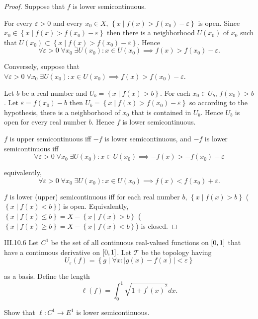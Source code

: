 \begin{proof}
    Suppose that \( f \) is lower semicontinuous.

    For every \( \varepsilon > 0 \) and every \( x_{0} \in X \), \( \left\{ x \mid f(x) > f(x_{0}) - \varepsilon \right\} \) is open. Since \( x_{0} \in \left\{ x \mid f(x) > f(x_{0}) - \varepsilon \right\} \) then there is a neighborhood \( U(x_{0}) \) of \( x_{0} \) such that \( U(x_{0}) \subset \left\{ x \mid f(x) > f(x_{0}) - \varepsilon \right\} \). Hence
    \[
        \forall \varepsilon > 0\; \forall x_{0}\; \exists U(x_{0}): x \in U(x_{0}) \implies f(x) > f(x_{0}) - \varepsilon.
    \]

    Conversely, suppose that \( \forall \varepsilon > 0\; \forall x_{0}\; \exists U(x_{0}): x \in U(x_{0}) \implies f(x) > f(x_{0}) - \varepsilon \).

    Let \( b \) be a real number and \( U_{b} = \left\{ x \mid f(x) > b \right\} \). For each \( x_{0} \in U_{b} \), \( f(x_{0}) > b \). Let \( \varepsilon = f(x_{0}) - b \) then \( U_{b} = \left\{ x \mid f(x) > f(x_{0}) - \varepsilon \right\} \) so according to the hypothesis, there is a neighborhood of \( x_{0} \) that is contained in \( U_{b} \). Hence \( U_{b} \) is open for every real number \(b\). Hence \( f \) is lower semicontinuous.

    \bigskip
    \(f\) is upper semicontinuous iff \( -f \) is lower semicontinuous, and \( -f \) is lower semicontinuous iff
    \[
        \forall \varepsilon > 0\; \forall x_{0}\; \exists U(x_{0}): x \in U(x_{0}) \implies -f(x) > -f(x_{0}) - \varepsilon
    \]

    equivalently,
    \[
        \forall \varepsilon > 0\; \forall x_{0}\; \exists U(x_{0}): x \in U(x_{0}) \implies f(x) < f(x_{0}) + \varepsilon.
    \]

    \bigskip
    \( f \) is lower (upper) semicontinuous iff for each real number \(b\), \( \left\{ x \mid f(x) > b \right\} \) (\( \left\{ x \mid f(x) < b \right\} \)) is open. Equivalently, \(  \left\{ x \mid f(x) \le b \right\} = X - \left\{ x \mid f(x) > b \right\} \) (\( \left\{ x \mid f(x) \ge b \right\} = X - \left\{ x \mid f(x) < b \right\} \)) is closed.
\end{proof}

\begin{problem}{III.10.6}
Let \(C^{1}\) be the set of all continuous real-valued functions on \( \left\lbrack{0,1}\right\rbrack \) that have a continuous derivative on \( \left\lbrack{0,1}\right\rbrack \). Let \( \mathscr{T} \) be the topology having
\[
    U_{\varepsilon}(f) = \left\{ g \mid \forall x: \left\vert g(x) - f(x) \right\vert < \varepsilon \right\}
\]

as a basis. Define the length
\[
    \ell(f) = \int_{0}^{1} \sqrt{1 + {f^{\prime}(x)}^{2}}dx.
\]

Show that \( \ell: C^{1} \to E^{1} \) is lower semicontinuous.
\end{problem}

